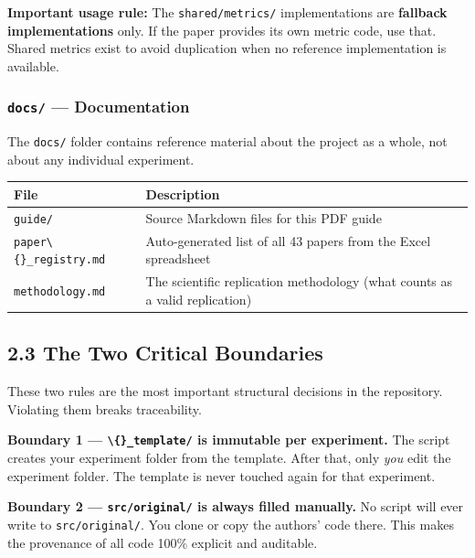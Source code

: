 \textbf{Important usage rule:} The
\texttt{shared/metrics/} implementations are
\textbf{fallback implementations} only. If the paper provides its own
metric code, use that. Shared metrics exist to avoid duplication when no
reference implementation is available.

\subsubsection{\texorpdfstring{\texttt{docs/} ---
Documentation}{docs/ --- Documentation}}\label{docs-documentation}

The \texttt{docs/} folder contains reference material
about the project as a whole, not about any individual experiment.

{\def\LTcaptype{none} %
\small
\begin{longtable}[]{@{}
  >{\raggedright\arraybackslash}p{}
  >{\raggedright\arraybackslash}p{}@{}}
\toprule\noalign{}
\begin{minipage}[b]{\linewidth}\raggedright
File
\end{minipage} & \begin{minipage}[b]{\linewidth}\raggedright
Description
\end{minipage} \\
\midrule\noalign{}
\endhead
\bottomrule\noalign{}
\endlastfoot
\texttt{guide/} & Source Markdown files for this PDF
guide \\
\texttt{paper\textbackslash\{\}\_registry.md} & Auto-generated list of
all 43 papers from the Excel spreadsheet \\
\texttt{methodology.md} & The scientific replication
methodology (what counts as a valid replication) \\
\end{longtable}
}

\subsection{2.3 The Two Critical
Boundaries}\label{the-two-critical-boundaries}

These two rules are the most important structural decisions in the
repository. Violating them breaks traceability.

\textbf{Boundary 1 --- \texttt{\textbackslash\{\}\_template/} is
immutable per experiment.} The script creates your experiment folder
from the template. After that, only \emph{you} edit the experiment
folder. The template is never touched again for that experiment.

\textbf{Boundary 2 --- \texttt{src/original/} is always
filled manually.} No script will ever write to
\texttt{src/original/}. You clone or copy the authors'
code there. This makes the provenance of all code 100\% explicit and
auditable.
